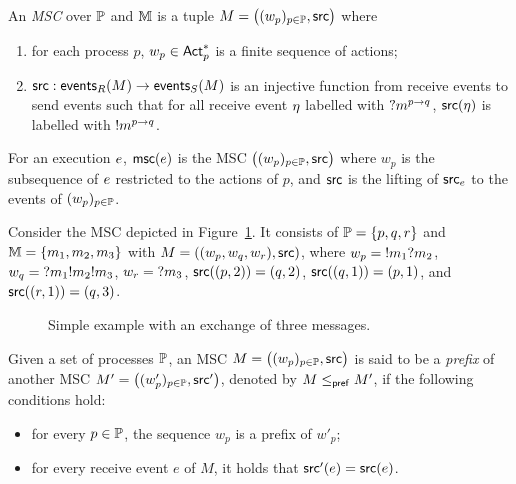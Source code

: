 \bigskip

\begin{definition}\label{def:msc}
	An \emph{MSC} over $\mathbb{P}$ and $\mathbb{M}$ is a tuple 
	$M = \big((w_p)_{p\in\mathbb{P}},\mathsf{src}\big)$ where
    \begin{enumerate}
        \item for each process $p$, $w_p\in\mathsf{Act}_{p}^*$ is a finite sequence 
			of actions;
		\item $\mathsf{src} : \mathsf{events}_R(M) \to \mathsf{events}_S(M)$ is 
			an injective function from receive events to send events such that
			for all receive event $\eta$ labelled with $?m^{p\to q}$,
			$\mathsf{src}(\eta)$ is labelled with $!m^{p\to q}$.
    \end{enumerate}
\end{definition}

For an execution $e$,  $\mathsf{msc}(e)$ is the MSC 
$\big((w_p)_{p\in\mathbb{P}},\mathsf{src}\big)$ where $w_p$ is the 
subsequence of $e$ restricted to the actions of $p$,
and $\mathsf{src}$ is the lifting of $\mathsf{src}_{e}$ to the
events of $(w_p)_{p\in\mathbb{P}}$.

\bigskip

\begin{example}\label{exmp:msc}
Consider the MSC depicted in Figure~\ref{fig:msc-exmp}.  
It consists of $\mathbb{P}=\{p,q,r\}$ and $\mathbb{M}=\{m_1,m_2,m_3\}$
with $M=((w_p,w_q,w_r),\mathsf{src})$, where
$w_p = {}!m_1{}?m_2$, 
$w_q = {}?m_1{}!m_2{}!m_3$, 
$w_r = {}?m_3$,
$\mathsf{src}((p,2)) = (q,2)$,
$\mathsf{src}((q,1)) = (p,1)$, and
$\mathsf{src}((r,1)) = (q,3)$.

\begin{figure}[!ht]
\centering
\begin{msc}[draw frame=none, draw head=none, msc keyword=, head height=0px, label distance=0.5ex, foot height=0px, foot distance=0px]{}

	\nextlevel
	\nextlevel
\end{msc}
\caption{Simple example with an exchange of three messages.}
\label{fig:msc-exmp}
\end{figure}
\end{example}

Given a set of processes $\mathbb{P}$, an MSC 
$M=\big((w_p)_{p\in\mathbb{P}},\mathsf{src}\big)$ is said to be a 
\emph{prefix} of another MSC 
$M'=\big((w'_p)_{p\in\mathbb{P}},\mathsf{src}'\big)$, denoted by 
$M \mathrel{\leq_{\mathsf{pref}}} M'$, if the following conditions hold:  
\begin{itemize}
    \item for every $p \in \mathbb{P}$, the sequence $w_p$ is a prefix 
    of $w'_p$;  
    \item for every receive event $e$ of $M$, it holds that 
    $\mathsf{src}'(e)=\mathsf{src}(e)$.  
\end{itemize}

